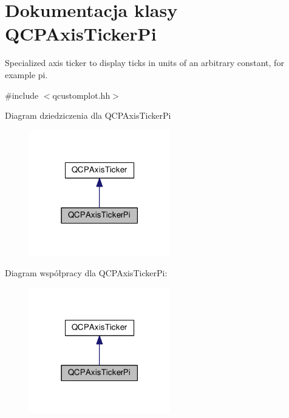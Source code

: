 \hypertarget{class_q_c_p_axis_ticker_pi}{}\section{Dokumentacja klasy Q\+C\+P\+Axis\+Ticker\+Pi}
\label{class_q_c_p_axis_ticker_pi}


Specialized axis ticker to display ticks in units of an arbitrary constant, for example pi.  




{\ttfamily \#include $<$qcustomplot.\+hh$>$}



Diagram dziedziczenia dla Q\+C\+P\+Axis\+Ticker\+Pi\nopagebreak
\begin{figure}[H]
\begin{center}
\leavevmode
\includegraphics[width=174pt]{class_q_c_p_axis_ticker_pi__inherit__graph}
\end{center}
\end{figure}


Diagram współpracy dla Q\+C\+P\+Axis\+Ticker\+Pi\+:\nopagebreak
\begin{figure}[H]
\begin{center}
\leavevmode
\includegraphics[width=174pt]{class_q_c_p_axis_ticker_pi__coll__graph}
\end{center}
\end{figure}
